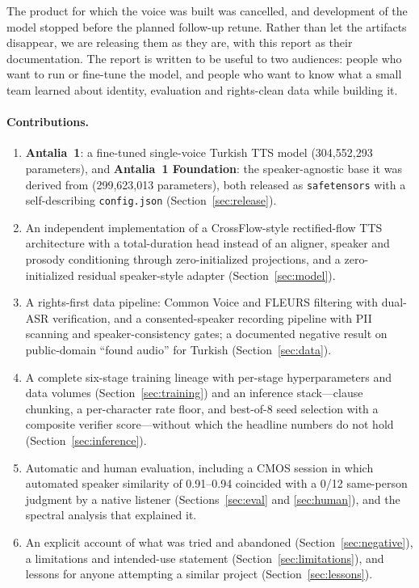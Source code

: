 \documentclass[10pt,twocolumn]{article}
\newcommand{\antalia}{Antalia~1}
\newcommand{\foundation}{Antalia~1 Foundation}
\newcommand{\code}[1]{\texttt{#1}}
\begin{document}
The product for which the voice was built was cancelled, and development of the model stopped before the planned follow-up retune. Rather than let the artifacts disappear, we are releasing them as they are, with this report as their documentation. The report is written to be useful to two audiences: people who want to run or fine-tune the model, and people who want to know what a small team learned about identity, evaluation and rights-clean data while building it.

\paragraph{Contributions.}
\begin{enumerate}[label=(\roman*)]
  \item \textbf{\antalia}: a fine-tuned single-voice Turkish TTS model (304,552,293 parameters), and \textbf{\foundation}: the speaker-agnostic base it was derived from (299,623,013 parameters), both released as \code{safetensors} with a self-describing \code{config.json} (Section~\ref{sec:release}).
  \item An independent implementation of a CrossFlow-style rectified-flow TTS architecture with a total-duration head instead of an aligner, speaker and prosody conditioning through zero-initialized projections, and a zero-initialized residual speaker-style adapter (Section~\ref{sec:model}).
  \item A rights-first data pipeline: Common Voice and FLEURS filtering with dual-ASR verification, and a consented-speaker recording pipeline with PII scanning and speaker-consistency gates; a documented negative result on public-domain ``found audio'' for Turkish (Section~\ref{sec:data}).
  \item A complete six-stage training lineage with per-stage hyperparameters and data volumes (Section~\ref{sec:training}) and an inference stack---clause chunking, a per-character rate floor, and best-of-8 seed selection with a composite verifier score---without which the headline numbers do not hold (Section~\ref{sec:inference}).
  \item Automatic and human evaluation, including a CMOS session in which automated speaker similarity of 0.91--0.94 coincided with a 0/12 same-person judgment by a native listener (Sections~\ref{sec:eval} and \ref{sec:human}), and the spectral analysis that explained it.
  \item An explicit account of what was tried and abandoned (Section~\ref{sec:negative}), a limitations and intended-use statement (Section~\ref{sec:limitations}), and lessons for anyone attempting a similar project (Section~\ref{sec:lessons}).
\end{enumerate}
\end{document}
